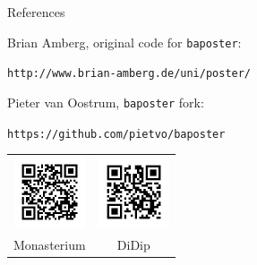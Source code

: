 \documentclass[a0paper,portrait]{baposter}
\begin{document}
\begin{poster}
\begin{posterbox}[name=references,column=2,below=two-column-box,span=1,above=bottom,headerColorOne=white]{References}

	Brian {\sc Amberg}, original code for \texttt{baposter}:  

	\texttt{http://www.brian-amberg.de/uni/poster/}
	\vspace{2em}

	Pieter {\sc van Oostrum}, \texttt{baposter} fork: 

	\texttt{https://github.com/pietvo/baposter}
%

\vspace{2em}
	\begin{center}
		\begin{tabular}{cc}
		\includegraphics[width=2.1cm]{qr_monasterium.png} &
			\includegraphics[width=2.1cm]{qr_didip.png} \\
		Monasterium & 
			DiDip
		\end{tabular}
	\end{center}
\end{posterbox}


\end{poster}
\end{document}
